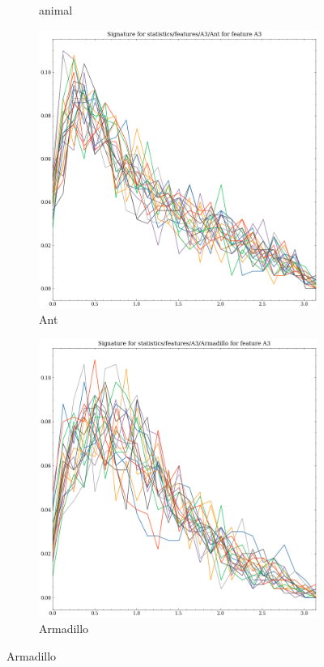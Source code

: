 \begin{figure}[ht]
\begin{subfigure}[b]{0.23\textwidth}
        \caption{animal}
        \label{fig:features-statistics-A3-b}    
    \end{subfigure}
    \hfill
    \begin{subfigure}[b]{0.23\textwidth}
        \includegraphics[width=\textwidth]{assets/feature_extraction/A3/Ant.png}
        \caption{Ant}
        \label{fig:features-statistics-A3-c}    
    \end{subfigure}
    \hfill    
    \begin{subfigure}[b]{0.23\textwidth}
        \includegraphics[width=\textwidth]{assets/feature_extraction/A3/Armadillo.png}
        \caption{Armadillo}
        \label{fig:features-statistics-A3-d}    
    \end{subfigure}
    \hfill
    

\end{figure}
